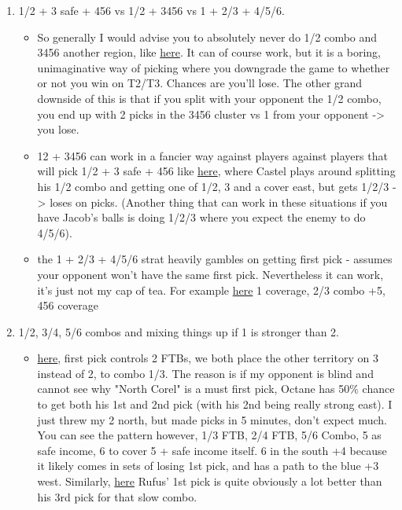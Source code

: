 \begin{enumerate}
    \item 1/2 + 3 safe + 456 vs 1/2 + 3456 vs 1 + 2/3 + 4/5/6.
    \begin{itemize}
        \item So generally I would advise you to absolutely never do 1/2 combo and 3456 another region, like \href{https://www.warzone.com/MultiPlayer?GameID=36661144}{here}. It can of course work, but it is a boring, unimaginative way of picking where you downgrade the game to whether or not you win on T2/T3. Chances are you'll lose. The other grand downside of this is that if you split with your opponent the 1/2 combo, you end up with 2 picks in the 3456 cluster vs 1 from your opponent -> you lose.
        \item 12 + 3456 can work in a fancier way against players against players that will pick 1/2 + 3 safe + 456 like \href{https://www.warzone.com/MultiPlayer?GameID=34380052}{here}, where Castel plays around splitting his 1/2 combo and getting one of 1/2, 3 and a cover east, but gets 1/2/3 -> loses on picks. (Another thing that can work in these situations if you have Jacob's balls is doing 1/2/3 where you expect the enemy to do 4/5/6).
        \item the 1 + 2/3 + 4/5/6 strat heavily gambles on getting first pick - assumes your opponent won't have the same first pick. Nevertheless it can work, it's just not my cap of tea. For example \href{https://www.warzone.com/MultiPlayer?GameID=33889327}{here} 1 coverage, 2/3 combo +5, 456 coverage
    \end{itemize}
    \item 1/2, 3/4, 5/6 combos and mixing things up if 1 is stronger than 2.
    \begin{itemize}
        \item \href{https://www.warzone.com/MultiPlayer?GameID=40838281}{here}, first pick controls 2 FTBs, we both place the other territory on 3 instead of 2, to combo 1/3. The reason is if my opponent is blind and cannot see why "North Corel" is a must first pick, Octane has 50\% chance to get both his 1st and 2nd pick (with his 2nd being really strong east). I just threw my 2 north, but made picks in 5 minutes, don't expect much. You can see the pattern however, 1/3 FTB, 2/4 FTB, 5/6 Combo, 5 as safe income, 6 to cover 5 + safe income itself. 6 in the south +4 because it likely comes in sets of losing 1st pick, and has a path to the blue +3 west. Similarly, \href{https://www.warzone.com/MultiPlayer?GameID=32067072}{here} Rufus' 1st pick is quite obviously a lot better than his 3rd pick for that slow combo.

\end{itemize}
\end{enumerate}

